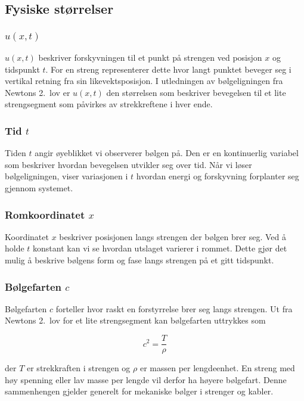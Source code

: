 \subsection{Fysiske størrelser}

\subsubsection{\texorpdfstring{$u(x,t)$}{u(x,t)}}
$u(x,t)$ beskriver forskyvningen til et punkt på strengen ved posisjon $x$ og tidspunkt $t$. 
For en streng representerer dette hvor langt punktet beveger seg i vertikal retning fra sin likevektsposisjon. 
I utledningen av bølgeligningen fra Newtons 2.\ lov er $u(x,t)$ den størrelsen som beskriver bevegelsen til et lite strengsegment som påvirkes av strekkreftene i hver ende.

\subsubsection{Tid \texorpdfstring{$t$}{t}}
Tiden $t$ angir øyeblikket vi observerer bølgen på. 
Den er en kontinuerlig variabel som beskriver hvordan bevegelsen utvikler seg over tid. 
Når vi løser bølgeligningen, viser variasjonen i $t$ hvordan energi og forskyvning forplanter seg gjennom systemet.

\subsubsection{Romkoordinatet \texorpdfstring{$x$}{x}}
Koordinatet $x$ beskriver posisjonen langs strengen der bølgen brer seg. 
Ved å holde $t$ konstant kan vi se hvordan utslaget varierer i rommet. 
Dette gjør det mulig å beskrive bølgens form og fase langs strengen på et gitt tidspunkt.

\subsubsection{Bølgefarten \texorpdfstring{$c$}{c}}
Bølgefarten $c$ forteller hvor raskt en forstyrrelse brer seg langs strengen. 
Ut fra Newtons 2.\ lov for et lite strengsegment kan bølgefarten uttrykkes som

\begin{equation}
   c^2 = \frac{T}{\rho} \label{eq:bølgefart}
\end{equation}

der $T$ er strekkraften i strengen og $\rho$ er massen per lengdeenhet. 
En streng med høy spenning eller lav masse per lengde vil derfor ha høyere bølgefart. 
Denne sammenhengen gjelder generelt for mekaniske bølger i strenger og kabler.

